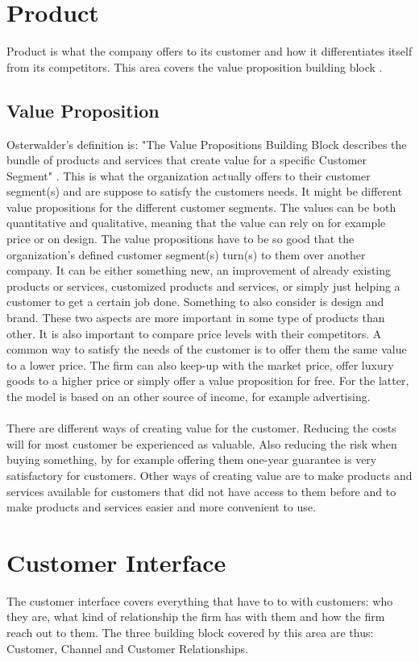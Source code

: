 \newpage
\section{Product}
Product is what the company offers to its customer and how it differentiates itself from its competitors. This area covers the value proposition building block \cite{osterwalderthesis}.

\subsection{Value Proposition}
Osterwalder's definition is: "The Value Propositions Building Block describes the bundle of products and services that create value for a specific Customer Segment" \cite{osterwalder}. This is what the organization actually offers to their customer segment(s) and are suppose to satisfy the customers needs. It might be different value propositions for the different customer segments. The values can be both quantitative and qualitative, meaning that the value can rely on for example price or on design. The value propositions have to be so good that the organization's defined customer segment(s) turn(s) to them over another company. It can be either something new, an improvement of already existing products or services, customized products and services, or simply just helping a customer to get a certain job done. Something to also consider is design and brand. These two aspects are more important in some type of products than other. It is also important to compare price levels with their competitors. A common way to satisfy the needs of the customer is to offer them the same value to a lower price. The firm can also keep-up with the market price, offer luxury goods to a higher price or simply offer a value proposition for free. For the latter, the model is based on an other source of income, for example advertising. \\ \\
There are different ways of creating value for the customer. Reducing the costs will for most customer be experienced as valuable. Also reducing the risk when buying something, by for example offering them one-year guarantee is very satisfactory for customers. Other ways of creating value are to make products and services available for customers that did not have access to them before and to make products and services easier and more convenient to use. \cite{osterwalder}

\section{Customer Interface}
The customer interface covers everything that have to to with customers: who they are, what kind of relationship the firm has with them and how the firm reach out to them. The three building block covered by this area are thus: Customer, Channel and Customer Relationships. \cite{osterwalderthesis}

